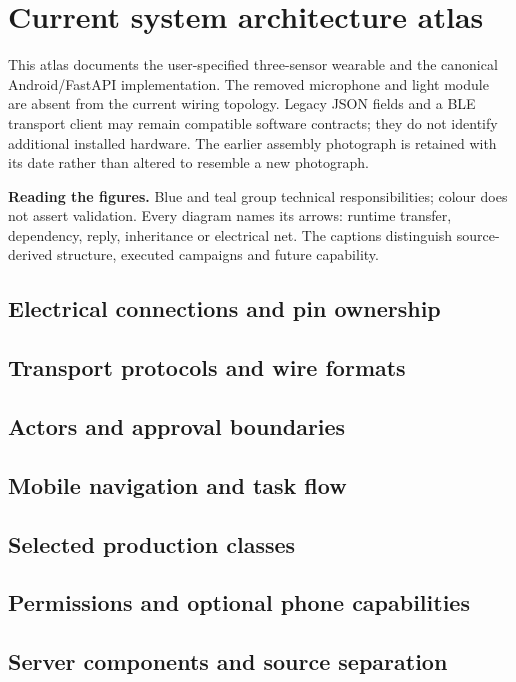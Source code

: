 \clearpage
\section{Current system architecture atlas}
\label{app:system-atlas}
This atlas documents the user-specified three-sensor wearable and the canonical Android/FastAPI implementation. The removed microphone and light module are absent from the current wiring topology. Legacy JSON fields and a BLE transport client may remain compatible software contracts; they do not identify additional installed hardware. The earlier assembly photograph is retained with its date rather than altered to resemble a new photograph.

\textbf{Reading the figures.} Blue and teal group technical responsibilities; colour does not assert validation. Every diagram names its arrows: runtime transfer, dependency, reply, inheritance or electrical net. The captions distinguish source-derived structure, executed campaigns and future capability.

\WearablePurposeFigure
\clearpage
\subsection{Electrical connections and pin ownership}
\WearableWiringFigure
\clearpage
\subsection{Transport protocols and wire formats}
\ProtocolStackFigure
\Needspace{10cm}
\subsection{Actors and approval boundaries}
\ActorsDiagram
\clearpage
\subsection{Mobile navigation and task flow}
\MobileFlowDiagram
\Needspace{12cm}
\subsection{Selected production classes}
\MobileClassDiagram
\clearpage
\subsection{Permissions and optional phone capabilities}
\PermissionsFigure
\clearpage
\subsection{Server components and source separation}
\ServerArchitectureDiagram
\Needspace{12cm}
